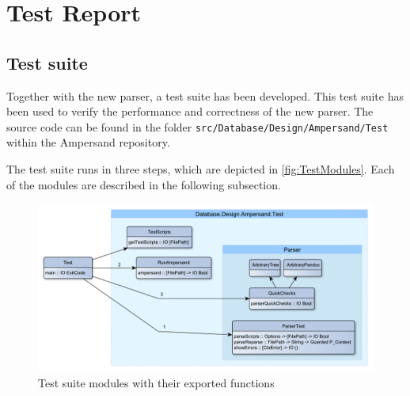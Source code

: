 
\section{Test Report}
\label{sec:tests}

\subsection{Test suite}
  Together with the new parser, a test suite has been developed.
  This test suite has been used to verify the performance and correctness of the new parser.
  The source code can be found in the folder \texttt{src/Database/Design/Ampersand/Test} within the Ampersand repository.

  The test suite runs in three steps, which are depicted in \autoref{fig:TestModules}.
  Each of the modules are described in the following subsection.
  \begin{figure}[ht]%
    \includegraphics[width=\columnwidth]{figures/TestModules.pdf}
    \caption{Test suite modules with their exported functions}
    \label{fig:TestModules}
  \end{figure}%

